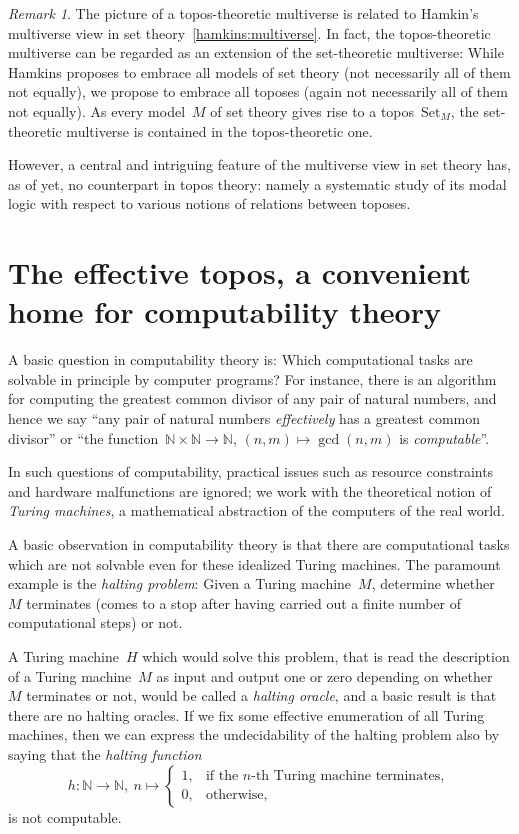 \documentclass[oneside,reqno]{amsart}
\theoremstyle{definition}
\theoremstyle{plain}
\theoremstyle{remark}
\newtheorem{rem}[defn]{Remark}
\newcommand{\NN}{\mathbb{N}}
\newcommand{\Set}{\mathrm{Set}}
\renewcommand{\_}{\mathpunct{.}\,}
\newcommand{\effective}{ef{}fective\xspace}
\newcommand{\effectively}{ef{}fectively\xspace}
\newcommand{\?}{\,{:}\,}
\begin{document}
\begin{rem}The picture of a topos-theoretic multiverse is related to Hamkin's
multiverse view in set theory~\ref{hamkins:multiverse}. In fact, the
topos-theoretic multiverse can be regarded as an extension of the set-theoretic
multiverse: While Hamkins proposes to embrace all models of set theory (not
necessarily all of them not equally), we propose to embrace all toposes (again
not necessarily all of them not equally). As every model~$M$ of set theory
gives rise to a topos~$\Set_M$, the set-theoretic multiverse is contained in the
topos-theoretic one.

However, a central and intriguing feature of the multiverse view in set theory
has, as of yet, no counterpart in topos theory: namely a systematic study of
its modal logic with respect to various notions of relations between toposes.\end{rem}


\section{The \effective topos, a convenient home for computability theory}
\label{sect:effective-topos}

A basic question in computability theory is: Which computational tasks are
solvable in principle by computer programs? For instance, there is an algorithm
for computing the greatest common divisor of any pair of natural numbers, and
hence we say ``any pair of natural numbers \emph{\effectively} has a greatest
common divisor''  or ``the function~$\NN \times \NN \to \NN,\,(n,m) \mapsto
\operatorname{gcd}(n,m)$ is \emph{computable}''.

In such questions of computability, practical issues such as resource
constraints and hardware malfunctions are ignored; we work with the theoretical
notion of \emph{Turing machines}, a mathematical abstraction of the computers
of the real world.

A basic observation in computability theory is that there are computational tasks
which are not solvable even for these idealized Turing machines. The paramount
example is the \emph{halting problem}: Given a Turing machine~$M$, determine
whether~$M$ terminates (comes to a stop after having carried out a finite
number of computational steps) or not.

A Turing machine~$H$ which would solve this problem, that is read the
description of a Turing machine~$M$ as input and output one or zero depending
on whether~$M$ terminates or not, would be called a \emph{halting oracle}, and
a basic result is that there are no halting oracles. If we fix some \effective
enumeration of all Turing machines, then we can express the undecidability of
the halting problem also by saying that the \emph{halting function}
\[ h : \NN \longrightarrow \NN,\ n \longmapsto \begin{cases}
  1, & \text{if the~$n$-th Turing machine terminates}, \\
  0, & \text{otherwise,}
\end{cases} \]
is not computable.
\end{document}
